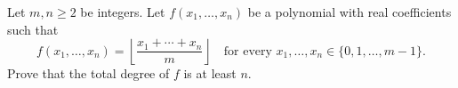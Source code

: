 Let $m, n \geq 2$ be integers. Let $f(x_1, \ldots, x_n)$ be a polynomial with real coefficients such that
\[ f(x_1, \ldots, x_n) = \left\lfloor \frac{x_1 + \cdots + x_n}{m} \right\rfloor \quad \text{for every } x_1, \ldots, x_n \in \{0, 1, \ldots, m-1\}. \]
Prove that the total degree of $f$ is at least $n$.
